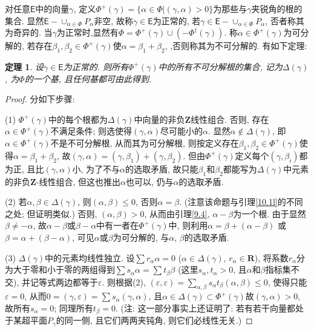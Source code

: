 \documentclass{ctexart}%
\newtheorem{theorem}{定理}
\theoremstyle{definition}
\theoremstyle{remark}
\begin{document}
对任意$\mathsf{E}$中的向量$\gamma$, 定义$\Phi^+(\gamma) = \{\alpha\in \Phi|(\gamma,\alpha)>0\}$为那些与$\gamma$夹锐角的根的集合. 显然$\mathsf{E}-\cup_{\alpha \in\Phi} P_\alpha$非空, 故称$\gamma\in \mathsf{E}$为正常的, 若$\gamma\in \mathsf{E}-\cup_{\alpha \in\Phi} P_\alpha$, 否者称其为奇异的. 当$\gamma$为正常时,显然有$\Phi=\Phi^+(\gamma)\cup(-\Phi^\dag(\gamma))$. 称$\alpha\in\Phi^+(\gamma)$为可分解的, 若存在$\beta_1,\beta_2\in\Phi^+(\gamma)$使$\alpha=\beta_1+\beta_2$, ,否则称其为不可分解的. 有如下定理:

\begin{theorem} \label{10.1}设$\gamma\in\mathsf{E}$为正常的. 则所有$\Phi^+(\gamma)$中的所有不可分解根的集合, 记为$\Delta(\gamma)$, 为$\Phi$的一个基, 且任何基都可由此得到.
\end{theorem}

\begin{proof}
分如下步骤:

(1) $\Phi^+(\gamma)$中的每个根都为$\Delta(\gamma)$中向量的非负$\mathbf{Z}$线性组合. 否则, 存在$\alpha\in \Phi^+(\gamma)$不满足条件; 则选使得$(\gamma,\alpha)$尽可能小的$\alpha$. 显然$\alpha\notin \Delta(\gamma)$, 即$\alpha \in \Phi^+(\gamma)$不是不可分解根, 从而其为可分解根, 则按定义存在$\beta_1,\beta_2\in\Phi^+(\gamma)$使得$\alpha=\beta_1+\beta_2$, 故$(\gamma,\alpha)=(\gamma,\beta_1)+(\gamma,\beta_2)$. 但由$\Phi^+(\gamma)$定义每个$(\gamma,\beta_i)$都为正, 且比$(\gamma,\alpha)$小, 为了不与$\alpha$的选取矛盾, 故只能$\beta_1$和$\beta_2$都能写为$\Delta(\gamma)$中元素的非负$\mathbf{Z}$-线性组合, 但这也推出$\alpha$也可以, 仍与$\alpha$的选取矛盾.

(2) 若$\alpha,\beta\in\Delta(\gamma)$, 则$(\alpha,\beta)\leq 0$, 否则$\alpha=\beta$. (注意该命题与引理\ref{10.1l}的不同之处; 但证明类似.) 否则, $(\alpha,\beta)>0$, 从而由引理\ref{9.4}, $\alpha-\beta$为一个根. 由于显然$\beta\neq -\alpha$, 故$\alpha-\beta$或$\beta-\alpha$中有一者在$\Phi^+(\gamma)$中, 则利用$\alpha=\beta+(\alpha-\beta)$ 或$\beta=\alpha+(\beta-\alpha)$, 可见$\alpha$或$\beta$为可分解的, 与$\alpha$, $\beta$的选取矛盾.

(3) $\Delta(\gamma)$中的元素均线性独立. 设$\sum r_\alpha \alpha = 0$ ($\alpha\in \Delta
(\gamma)$, $r_\alpha\in\mathbf{R}$), 将系数$r_\alpha$分为大于零和小于零的两组得到$\sum s_\alpha \alpha = \sum t_\beta \beta$ (这里$s_\alpha,t_\alpha >0$, 且$\alpha$和$\beta$指标集不交), 并记等式两边都等于$\varepsilon$. 则根据(2), $(\varepsilon,\varepsilon) = \sum_{\alpha,\beta} s_\alpha t_\beta (\alpha,\beta) \leq 0$, 使得只能$\varepsilon=0$, 从而$0=(\gamma,\varepsilon) = \sum s_\alpha(\gamma,\alpha)$, 且$\alpha\in \Delta(\gamma)\subset \Phi^+(\gamma)$故$(\gamma,\alpha)>0$, 故所有$s_\alpha=0$; 同理所有$t_\beta=0$. (注: 这一部分事实上还证明了: 若有若干向量都处于某超平面$P_\gamma$的同一侧, 且它们两两夹钝角, 则它们必线性无关.)


\end{proof}
\end{document}
